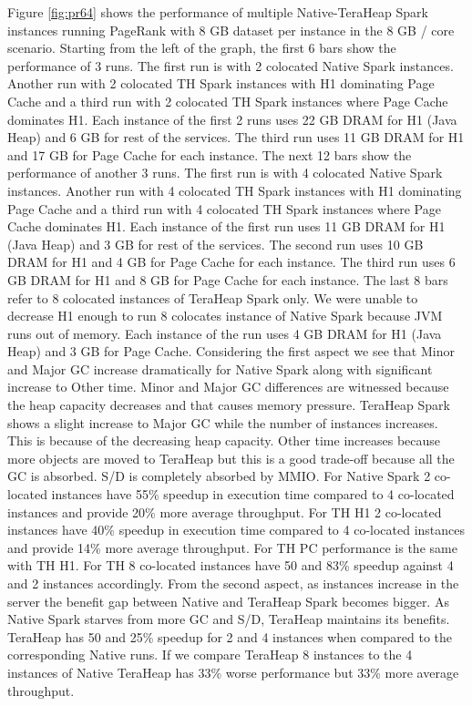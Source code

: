 Figure \ref{fig:pr64} shows the performance of multiple
Native-TeraHeap Spark instances running PageRank with 8 GB
dataset per instance in the 8 GB / core scenario.
Starting from the left of the graph, the first 6 bars show the
performance of 3 runs. The first run is with 2 colocated Native Spark instances.
Another run with 2 colocated TH Spark instances with H1 dominating Page Cache
and a third run with 2 colocated TH Spark instances where Page Cache dominates H1.
Each instance of the first 2 runs uses 22 GB DRAM for H1 (Java Heap) and 6 GB for rest of the services.
The third run uses 11 GB DRAM for H1 and 17 GB for Page Cache for each instance. 
The next 12 bars show the performance of another 3 runs. The first run is with 4 colocated Native Spark instances.
Another run with 4 colocated TH Spark instances with H1 dominating Page Cache
and a third run with 4 colocated TH Spark instances where Page Cache dominates H1.
Each instance of the first run uses 11 GB DRAM for H1 (Java Heap) and 3 GB for rest of the services.
The second run uses 10 GB DRAM for H1 and 4 GB for Page Cache for each instance.
The third run uses 6 GB DRAM for H1 and 8 GB for Page Cache for each instance.
The last 8 bars refer to 8 colocated instances of TeraHeap Spark only. 
We were unable to decrease H1 enough to run 8 colocates instance of Native Spark
because JVM runs out of memory. Each instance of the run uses 4 GB DRAM for H1 (Java Heap) and 3 GB for Page Cache.
Considering the first aspect we see that Minor and Major GC increase dramatically for Native Spark along with significant increase to Other time. Minor and Major GC differences are witnessed because the heap capacity decreases and that causes memory pressure. TeraHeap Spark shows a slight increase to Major GC while the number of instances increases. This is because of the decreasing heap capacity. Other time increases because more objects are moved to TeraHeap but this is a good trade-off because all the GC is absorbed. S/D is completely absorbed by MMIO. 
For Native Spark 2 co-located instances have 55\% speedup in execution time compared to 4 co-located instances and provide 20\% more average throughput. For TH H1 2 co-located instances have 40\% speedup in execution time compared to 4 co-located instances and provide 14\% more average throughput. For TH PC performance is the same with TH H1. For TH 8 co-located instances have 50 and 83\% speedup against 4 and 2 instances accordingly.
From the second aspect, as instances increase in the server the benefit gap between Native and TeraHeap Spark becomes bigger. As Native Spark starves from more GC and S/D, TeraHeap maintains its benefits. TeraHeap has 50 and 25\% speedup for 2 and 4 instances when compared to the corresponding Native runs. If we compare TeraHeap 8 instances to the 4 instances of Native TeraHeap has 33\% worse performance but 33\% more average throughput.

